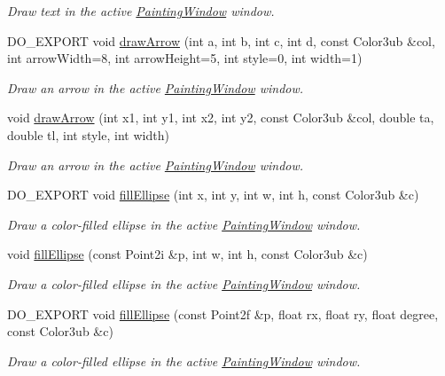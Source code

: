 \begin{DoxyCompactItemize}
\begin{DoxyCompactList}\small\item\em Draw text in the active \hyperlink{class_d_o_1_1_painting_window}{Painting\-Window} window. \end{DoxyCompactList}\item 
D\-O\-\_\-\-E\-X\-P\-O\-R\-T void \hyperlink{group___draw2_d_ga16d65640d0280fda29e54c359bf03357}{draw\-Arrow} (int a, int b, int c, int d, const Color3ub \&col, int arrow\-Width=8, int arrow\-Height=5, int style=0, int width=1)
\begin{DoxyCompactList}\small\item\em Draw an arrow in the active \hyperlink{class_d_o_1_1_painting_window}{Painting\-Window} window. \end{DoxyCompactList}\item 
void \hyperlink{group___draw2_d_ga23b2f26a1d7ffaa2c1e72aedeaa76dfa}{draw\-Arrow} (int x1, int y1, int x2, int y2, const Color3ub \&col, double ta, double tl, int style, int width)
\begin{DoxyCompactList}\small\item\em Draw an arrow in the active \hyperlink{class_d_o_1_1_painting_window}{Painting\-Window} window. \end{DoxyCompactList}\item 
D\-O\-\_\-\-E\-X\-P\-O\-R\-T void \hyperlink{group___draw2_d_ga3ed03162b6c7f9878b29744b4ff93d08}{fill\-Ellipse} (int x, int y, int w, int h, const Color3ub \&c)
\begin{DoxyCompactList}\small\item\em Draw a color-\/filled ellipse in the active \hyperlink{class_d_o_1_1_painting_window}{Painting\-Window} window. \end{DoxyCompactList}\item 
void \hyperlink{group___draw2_d_ga857cc343c89d77047513cfffec925d83}{fill\-Ellipse} (const Point2i \&p, int w, int h, const Color3ub \&c)
\begin{DoxyCompactList}\small\item\em Draw a color-\/filled ellipse in the active \hyperlink{class_d_o_1_1_painting_window}{Painting\-Window} window. \end{DoxyCompactList}\item 
D\-O\-\_\-\-E\-X\-P\-O\-R\-T void \hyperlink{group___draw2_d_ga0cd7ab76249b31006f12efb89e96930a}{fill\-Ellipse} (const Point2f \&p, float rx, float ry, float degree, const Color3ub \&c)
\begin{DoxyCompactList}\small\item\em Draw a color-\/filled ellipse in the active \hyperlink{class_d_o_1_1_painting_window}{Painting\-Window} window. \end{DoxyCompactList}\item 

\end{DoxyCompactItemize}
